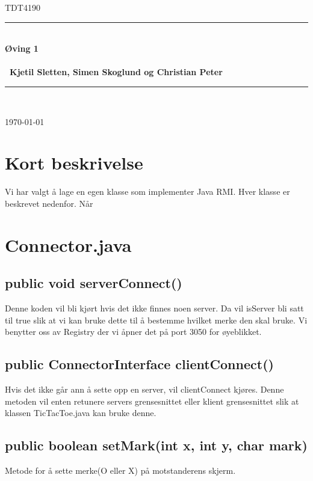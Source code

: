 \documentclass[11pt, a4paper]{article}	%
\begin{document}
\begin{titlepage}
\newcommand{\HRule}{\rule{\linewidth}{0.5mm}}
 
\begin{center}
 

\textsc{\huge TDT4190 }\\[2.0cm]

 
\HRule \\[0.3cm]
{\huge \bfseries  Øving  1
\\\ \\\ \LARGE Kjetil Sletten, Simen Skoglund og Christian Peter }\\[0.4cm]
\HRule \\[1.5cm]
 
\vfill
 
{\large \today}
 
\end{center}
\end{titlepage}

\section{Kort beskrivelse}
Vi har valgt å lage en egen klasse som implementer Java RMI. Hver klasse er beskrevet nedenfor. Når 

\section{Connector.java}
\subsection*{public void serverConnect()}
Denne koden vil bli kjørt hvis det ikke finnes noen server. Da vil isServer bli satt til true slik at vi kan bruke dette til å bestemme hvilket merke den skal bruke. Vi benytter oss av Registry der vi åpner det på port 3050 for øyeblikket.
\subsection*{public ConnectorInterface clientConnect()}
Hvis det ikke går ann å sette opp en server, vil clientConnect kjøres. Denne metoden vil enten retunere servers grensesnittet eller klient grensesnittet slik at klassen TicTacToe.java kan bruke denne.


\subsection*{public boolean setMark(int x, int y, char mark)}
Metode for å sette merke(O eller X) på motstanderens skjerm.
\end{document}
